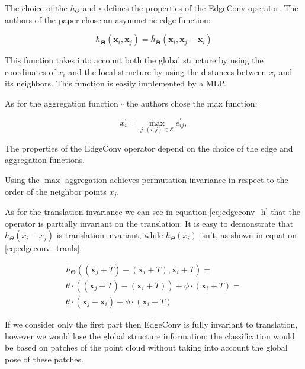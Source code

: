 The choice of the $h_{\Theta}$ and $\square$ defines the properties of the EdgeConv operator. The authors of the paper chose an asymmetric edge function:

\begin{equation}\label{eq:edgeconv_h}
h_{\mathbf{\Theta}}\left(\mathbf{x}_{i}, \mathbf{x}_{j}\right)=\bar{h}_{\mathbf{\Theta}}\left(\mathbf{x}_{i}, \mathbf{x}_{j}-\mathbf{x}_{i}\right)
\end{equation}

This function takes into account both the global structure by using the coordinates of $x_i$ and the local structure by using the distances between $x_i$ and its neighbors. This function is easily implemented by a MLP.

As for the aggregation function $\square$ the authors chose the max function:

$$
x_{i}^{\prime}=\max _{j:(i, j) \in \mathcal{E}} e_{i j}^{\prime},
$$

The properties of the EdgeConv operator depend on the choice of the edge and aggregation functions.

Using the $\max$ aggregation achieves permutation invariance in respect to the order of the neighbor points $x_j$.

As for the translation invariance we can see in equation \ref{eq:edgeconv_h} that the operator is partially invariant on the translation. It is easy to demonstrate that $h_{\Theta}(x_i - x_j)$ is translation invariant, while $h_{\Theta}(x_i)$ isn't, as shown in equation \ref{eq:edgeconv_tranls}.

\begin{equation}\label{eq:edgeconv_tranls}
\begin{split}
    \bar{h}_{\mathbf{\Theta}}\left((\mathbf{x}_{j} + T)-(\mathbf{x}_{i} + T), \mathbf{x}_{i} + T \right) = \\
    \theta \cdot ((\mathbf{x}_{j} + T)-(\mathbf{x}_{i} + T)) + \phi \cdot (\mathbf{x}_{i} + T) = \\
    \theta \cdot (\mathbf{x}_{j}-\mathbf{x}_{i}) + \phi \cdot (\mathbf{x}_{i} + T)
\end{split}
\end{equation}


If we consider only the first part then EdgeConv is fully invariant to translation, however we would lose the global structure information: the classification would be based on patches of the point cloud without taking into account the global pose of these patches.

